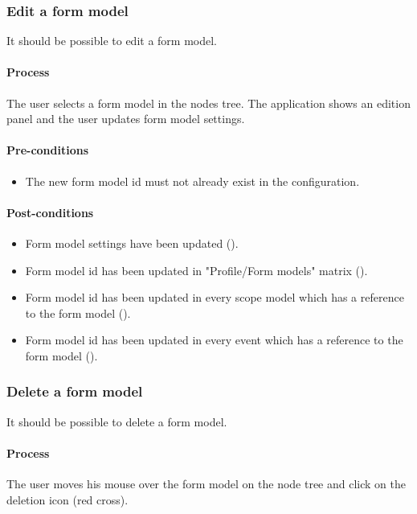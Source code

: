\documentclass[11pt,a4paper,oneside]{article}
\begin{document}
\subsubsection{Edit a form model}
It should be possible to edit a form model.

\paragraph{Process}
The user selects a form model in the nodes tree. The application shows an edition panel and the user updates form model settings.

\paragraph{Pre-conditions}
\begin{itemize}
	\item The new form model id must not already exist in the configuration.
\end{itemize}

\paragraph{Post-conditions}
\begin{itemize}
	\item Form model settings have been updated ().
	\item Form model id has been updated in "Profile/Form models" matrix ().
	\item Form model id has been updated in every scope model which has a reference to the form model ().
	\item Form model id has been updated in every event which has a reference to the form model ().
\end{itemize}

\subsubsection{Delete a form model}
It should be possible to delete a form model.

\paragraph{Process}
The user moves his mouse over the form model on the node tree and click on the deletion icon (red cross).
\end{document}
